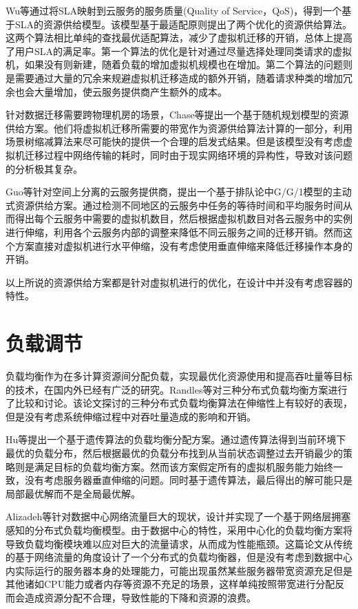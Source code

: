 Wu等通过将SLA映射到云服务的服务质量(Quality of Service，QoS)，得到一个基于SLA的资源供给模型\cite{wu2014sla}。该模型基于最适配原则提出了两个优化的资源供给算法。这两个算法相比单纯的查找最优适配算法，减少了虚拟机迁移的开销，总体上提高了用户SLA的满足率。第一个算法的优化是针对通过尽量选择处理同类请求的虚拟机，如果没有则新建，随着负载的增加虚拟机规模也在增加。第二个算法的问题则是需要通过大量的冗余来规避虚拟机迁移造成的额外开销，随着请求种类的增加冗余也会大量增加，使云服务提供商产生额外的成本。

针对数据迁移需要跨物理机房的场景，Chase等提出一个基于随机规划模型的资源供给方案\cite{chase2017joint}。他们将虚拟机迁移所需要的带宽作为资源供给算法计算的一部分，利用场景树缩减算法来尽可能快的提供一个合理的启发式结果。但是该模型没有考虑虚拟机迁移过程中网络传输的耗时，同时由于现实网络环境的异构性，导致对该问题的分析极其复杂。

Guo等针对空间上分离的云服务提供商，提出一个基于排队论中G/G/1模型的主动式资源供给方案\cite{guo2016geoscale}。通过检测不同地区的云服务中任务的等待时间和平均服务时间从而得出每个云服务中需要的虚拟机数目，然后根据虚拟机数目对各云服务中的实例进行伸缩，利用各个云服务内部的调整来降低不同云服务之间的迁移开销。然而这个方案直接对虚拟机进行水平伸缩，没有考虑使用垂直伸缩来降低迁移操作本身的开销。

以上所说的资源供给方案都是针对虚拟机进行的优化，在设计中并没有考虑容器的特性。

\section{负载调节}
负载均衡作为在多计算资源间分配负载，实现最优化资源使用和提高吞吐量等目标的技术，在国内外已经有广泛的研究。Randles等对三种分布式负载均衡方案进行了比较和讨论\cite{randles2010comparative}。该论文探讨的三种分布式负载均衡算法在伸缩性上有较好的表现，但是没有考虑系统伸缩过程中对吞吐量造成的影响和开销。

Hu等提出一个基于遗传算法的负载均衡分配方案\cite{hu2010scheduling}。通过遗传算法得到当前环境下最优的负载分布，然后根据最优的负载分布找到从当前状态调整过去开销最少的策略则是满足目标的负载均衡方案。然而该方案假定所有的虚拟机服务能力始终一致，没有考虑服务器垂直伸缩的问题。同时基于遗传算法，最后得出的解可能只是局部最优解而不是全局最优解。

Alizadeh等针对数据中心网络流量巨大的现状，设计并实现了一个基于网络层拥塞感知的分布式负载均衡模型\cite{alizadeh2014conga}。由于数据中心的特性，采用中心化的负载均衡方案将导致负载均衡模块难以应对巨大的流量请求，从而成为性能瓶颈。这篇论文从传统的基于网络流量的角度设计了一个分布式的负载均衡器，但是没有考虑到数据中心内实际运行的服务器本身的处理能力，可能出现虽然某些服务器带宽资源充足但是其他诸如CPU能力或者内存等资源不充足的场景，这样单纯按照带宽进行分配反而会造成资源分配不合理，导致性能的下降和资源的浪费。

